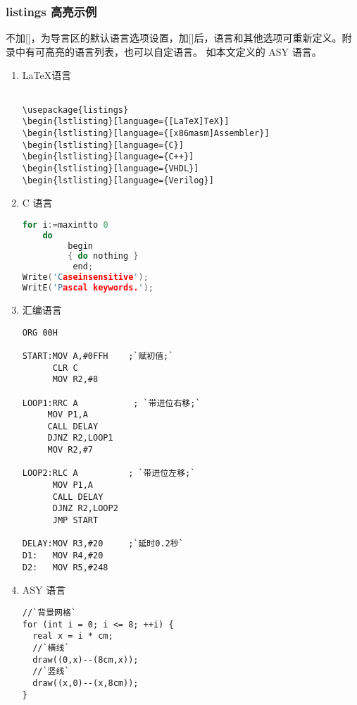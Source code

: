 \subsubsection{listings 高亮示例}

不加[]，为导言区的默认语言选项设置，加[]后，语言和其他选项可重新定义。附录中有可高亮的语言列表，也可以自定语言。
如本文定义的 ASY 语言。

\begin{enumerate}

\item \LaTeX 语言
\begin{lstlisting}[language={[LaTeX]TeX}]

\usepackage{listings}
\begin{lstlisting}[language={[LaTeX]TeX}]
\begin{lstlisting}[language={[x86masm]Assembler}]
\begin{lstlisting}[language={C}]
\begin{lstlisting}[language={C++}]
\begin{lstlisting}[language={VHDL}]
\begin{lstlisting}[language={Verilog}]

\end{lstlisting}
  \item C 语言
\begin{lstlisting}[language={C++}]
for i:=maxintto 0
    do
         begin
         { do nothing }
          end;
Write('Caseinsensitive');
WritE('Pascal keywords.');
\end{lstlisting}
  \item 汇编语言
\begin{lstlisting}[language={[x86masm]Assembler}]
ORG 00H

START:MOV A,#0FFH    ;`赋初值;`
      CLR C
      MOV R2,#8

LOOP1:RRC A           ; `带进位右移;`
     MOV P1,A
     CALL DELAY
     DJNZ R2,LOOP1
     MOV R2,#7

LOOP2:RLC A          ; `带进位左移;`
      MOV P1,A
      CALL DELAY
      DJNZ R2,LOOP2
      JMP START

DELAY:MOV R3,#20     ;`延时0.2秒`
D1:   MOV R4,#20
D2:   MOV R5,#248
\end{lstlisting}
  \item ASY 语言
\begin{lstlisting}
//`背景网格`
for (int i = 0; i <= 8; ++i) {
  real x = i * cm;
  //`横线`
  draw((0,x)--(8cm,x));
  //`竖线`
  draw((x,0)--(x,8cm));
}
\end{lstlisting}


\end{enumerate}
